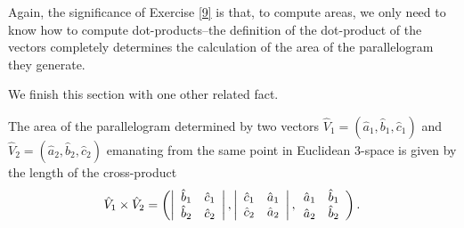 Again, the significance of Exercise \ref{9} is that, to compute areas, we only
need to know how to compute dot-products--the definition of the dot-product of
the vectors completely determines the calculation of the area of the
parallelogram they generate.

We finish this section with one other related fact.

\begin{lemma}
The area of the parallelogram determined by two vectors $\hat{V}_{1}=\left(
\hat{a}_{1},\hat{b}_{1},\hat{c}_{1}\right)  $ and $\hat{V}_{2}=\left(  \hat
{a}_{2},\hat{b}_{2},\hat{c}_{2}\right)  $ emanating from the same point in
Euclidean $3$-space is given by the length of the cross-product%
\[
\hat{V}_{1}\times\hat{V}_{2}=\left(  \left\vert
\begin{array}
[c]{cc}%
\hat{b}_{1} & \hat{c}_{1}\\
\hat{b}_{2} & \hat{c}_{2}%
\end{array}
\right\vert ,\left\vert
\begin{array}
[c]{cc}%
\hat{c}_{1} & \hat{a}_{1}\\
\hat{c}_{2} & \hat{a}_{2}%
\end{array}
\right\vert ,%
\begin{array}
[c]{cc}%
\hat{a}_{1} & \hat{b}_{1}\\
\hat{a}_{2} & \hat{b}_{2}%
\end{array}
\right)  .
\]

\end{lemma}

